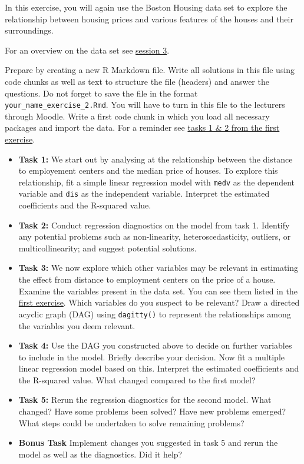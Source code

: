 \documentclass[
]{book}
\begin{document}
In this exercise, you will again use the Boston Housing data set to explore the
relationship between housing prices and various features of the houses and their
surroundings.

For an overview on the data set see \protect\hyperlink{eda-2}{session 3}.

Prepare by creating a new R Markdown file.
Write all solutions in this file using code chunks as well as text to structure
the file (headers) and answer the questions. Do not forget to save the file in
the format \texttt{your\_name\_exercise\_2.Rmd}.
You will have to turn in this file to the lecturers through Moodle.
Write a first code chunk in which you load
all necessary packages and import the data. For a reminder see
\protect\hyperlink{eda-2}{tasks 1 \& 2 from the first exercise}.

\begin{itemize}
\item
  \textbf{Task 1:} We start out by analysing at the relationship between the
  distance to employement centers and the median price of houses.
  To explore this relationship, fit a simple linear regression model with
  \texttt{medv} as the dependent variable and \texttt{dis} as the independent variable.
  Interpret the estimated coefficients and the R-squared value.
\item
  \textbf{Task 2:} Conduct regression diagnostics on the model from task 1.
  Identify any potential problems such as non-linearity, heteroscedasticity,
  outliers, or multicollinearity; and suggest potential solutions.
\item
  \textbf{Task 3:} We now explore which other variables may be relevant in
  estimating the effect from distance to employment centers on the price of a
  house.
  Examine the variables present in the data set. You can see them listed in
  the \protect\hyperlink{eda-2}{first exercise}.
  Which variables do you suspect to be relevant?
  Draw a directed acyclic graph (DAG) using \texttt{dagitty()} to represent the
  relationships among the variables you deem relevant.
\item
  \textbf{Task 4:} Use the DAG you constructed above to decide on further variables
  to include in the model. Briefly describe your decision.
  Now fit a multiple linear regression model based on this.
  Interpret the estimated coefficients and the R-squared value. What changed
  compared to the first model?
\item
  \textbf{Task 5:} Rerun the regression diagnostics for the second model. What
  changed? Have some problems been solved? Have new problems emerged?
  What steps could be undertaken to solve remaining problems?
\item
  \textbf{Bonus Task} Implement changes you suggested in task 5 and rerun the
  model as well as the diagnostics. Did it help?
\end{itemize}
\end{document}
